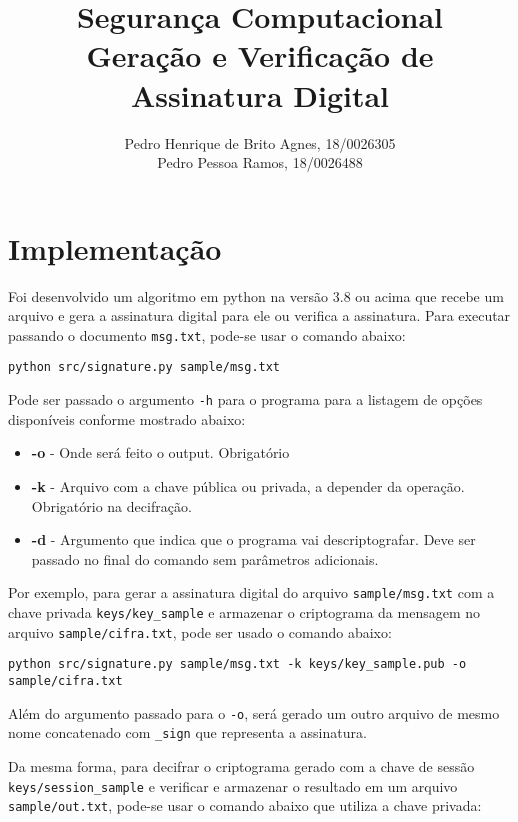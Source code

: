 \documentclass[12pt]{article}
\title{\textbf{Segurança Computacional\\ \Large{Geração e Verificação de Assinatura Digital}}}
\author{Pedro Henrique de Brito Agnes, 18/0026305
\\ Pedro Pessoa Ramos, 18/0026488
}
\affil{Dep. Ciência da Computação - Universidade de Brasília (UnB) \vspace{-2ex}}
\date{}
\begin{document}
\maketitle

\section{Implementação}

Foi desenvolvido um algoritmo em python na versão 3.8 ou acima que recebe um arquivo e gera a assinatura digital para ele ou verifica a assinatura. Para executar passando o documento \texttt{msg.txt}, pode-se usar o comando abaixo:

\begin{lstlisting}
python src/signature.py sample/msg.txt
\end{lstlisting}

Pode ser passado o argumento \texttt{-h} para o programa para a listagem de opções disponíveis conforme mostrado abaixo:

\begin{itemize}
    \item \textbf{-o} - Onde será feito o output. Obrigatório
    \item \textbf{-k} - Arquivo com a chave pública ou privada, a depender da operação. Obrigatório na decifração.
    \item \textbf{-d} - Argumento que indica que o programa vai descriptografar. Deve ser passado no final do comando sem parâmetros adicionais.
\end{itemize}

Por exemplo, para gerar a assinatura digital do arquivo \texttt{sample/msg.txt} com a chave privada \texttt{keys/key\_sample} e armazenar o criptograma da mensagem no arquivo \texttt{sample/cifra.txt}, pode ser usado o comando abaixo:

\begin{lstlisting}
python src/signature.py sample/msg.txt -k keys/key_sample.pub -o sample/cifra.txt
\end{lstlisting}

Além do argumento passado para o \texttt{-o}, será gerado um outro arquivo de mesmo nome concatenado com \texttt{\_sign} que representa a assinatura.

Da mesma forma, para decifrar o criptograma gerado com a chave de sessão \texttt{keys/session\_sample} e verificar e armazenar o resultado em um arquivo \texttt{sample/out.txt}, pode-se usar o comando abaixo que utiliza a chave privada:
\end{document}
